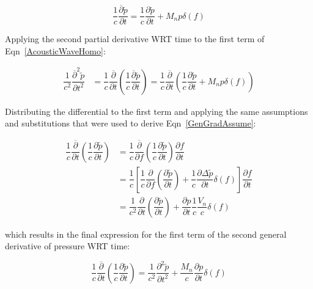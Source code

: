 \documentclass[]{aiaa-tc}%
\begin{document}
\begin{equation} \label{GenTimeP}
\dfrac{1}{c}\dfrac{\overline{\partial}\widetilde{p}}{\partial t}
= \dfrac{1}{c}\dfrac{\partial\widetilde{p}}{\partial t}
    + M_n p\delta(f)
\end{equation}

Applying the second partial derivative WRT time to the first term of Eqn~\ref{AcousticWaveHomo}:

\begin{align*}
\dfrac{1}{c^2}\dfrac{\overline{\partial}^2\widetilde{p}}{\partial t^2}
    &= \dfrac{1}{c}\dfrac{\overline{\partial}}{\partial t} \left(
    \dfrac{1}{c}\dfrac{\overline{\partial}\widetilde{p}}{\partial t} \right)
= \dfrac{1}{c}\dfrac{\overline{\partial}}{\partial t} \left(
\dfrac{1}{c}\dfrac{\partial\widetilde{p}}{\partial t}
    + M_n p\delta(f) \right)
\end{align*}

\noindent Distributing the differential to the first term and applying the same assumptions and substitutions that were used to derive Eqn~\ref{GenGradAssume}:

\begin{align*}
\dfrac{1}{c}\dfrac{\overline{\partial}}{\partial t}
    \left( \dfrac{1}{c}\dfrac{\partial\widetilde{p}}{\partial t} \right)
    &= \dfrac{1}{c}\dfrac{\overline{\partial}}{\partial f}
    \left( \dfrac{1}{c}\dfrac{\partial\widetilde{p}}{\partial t} \right)
    \dfrac{\partial f}{\partial t} \\
&= \dfrac{1}{c} \left[
    \dfrac{1}{c} \dfrac{\partial}{\partial f} \left(
    \dfrac{\partial\widetilde{p}}{\partial t} \right)
    + \dfrac{1}{c} \dfrac{\partial\Delta\widetilde{p}}{\partial t} \delta(f)
    \right] \dfrac{\partial f}{\partial t} \\
&=  \dfrac{1}{c^2} \dfrac{\partial}{\partial t} \left(
    \dfrac{\partial\widetilde{p}}{\partial t} \right)
    + \dfrac{\partial p}{\partial t} \dfrac{1}{c}\dfrac{V_n}{c} \delta(f)
\end{align*}

\noindent which results in the final expression for the first term of the second general derivative of pressure WRT time:

\begin{equation} \label{2ndDerTerm1}
\dfrac{1}{c}\dfrac{\overline{\partial}}{\partial t}
    \left( \dfrac{1}{c}\dfrac{\partial\widetilde{p}}{\partial t} \right)
=  \dfrac{1}{c^2} \dfrac{\partial^2\widetilde{p}}{\partial t^2}
    + \dfrac{M_n}{c} \dfrac{\partial p}{\partial t}  \delta(f)
\end{equation}
\end{document}
